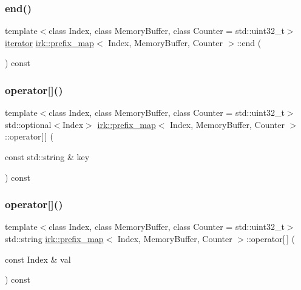 \subsubsection{\texorpdfstring{end()}{end()}}
{\footnotesize\ttfamily template$<$class Index, class Memory\+Buffer, class Counter = std\+::uint32\+\_\+t$>$ \\
\mbox{\hyperlink{classirk_1_1prefix__map_1_1iterator}{iterator}} \mbox{\hyperlink{classirk_1_1prefix__map}{irk\+::prefix\+\_\+map}}$<$ Index, Memory\+Buffer, Counter $>$\+::end (\begin{DoxyParamCaption}{ }\end{DoxyParamCaption}) const\hspace{0.3cm}{\ttfamily [inline]}}

\mbox{\label{classirk_1_1prefix__map_af8c0c9c8a7bc1b31d03111e714aaec2b}} 
\subsubsection{\texorpdfstring{operator[]()}{operator[]()}\hspace{0.1cm}{\footnotesize\ttfamily [1/2]}}
{\footnotesize\ttfamily template$<$class Index, class Memory\+Buffer, class Counter = std\+::uint32\+\_\+t$>$ \\
std\+::optional$<$Index$>$ \mbox{\hyperlink{classirk_1_1prefix__map}{irk\+::prefix\+\_\+map}}$<$ Index, Memory\+Buffer, Counter $>$\+::operator\mbox{[}$\,$\mbox{]} (\begin{DoxyParamCaption}\item[{const std\+::string \&}]{key }\end{DoxyParamCaption}) const\hspace{0.3cm}{\ttfamily [inline]}}

\mbox{\label{classirk_1_1prefix__map_a403d1389dab40173b52d5faa82b6aff6}} 
\subsubsection{\texorpdfstring{operator[]()}{operator[]()}\hspace{0.1cm}{\footnotesize\ttfamily [2/2]}}
{\footnotesize\ttfamily template$<$class Index, class Memory\+Buffer, class Counter = std\+::uint32\+\_\+t$>$ \\
std\+::string \mbox{\hyperlink{classirk_1_1prefix__map}{irk\+::prefix\+\_\+map}}$<$ Index, Memory\+Buffer, Counter $>$\+::operator\mbox{[}$\,$\mbox{]} (\begin{DoxyParamCaption}\item[{const Index \&}]{val }\end{DoxyParamCaption}) const\hspace{0.3cm}{\ttfamily [inline]}}


